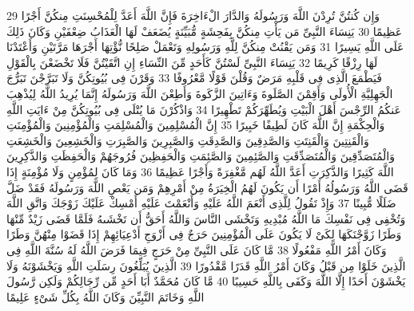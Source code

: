 \documentclass[20pt,a4paper]{article}
\begin{document}
{\tiny\colorbox{cl_aya}{29}} وَإِن كُنتُنَّ تُرِدْنَ اللَّهَ وَرَسُولَهُ وَالدَّارَ الْءَاخِرَةَ فَإِنَّ اللَّهَ أَعَدَّ لِلْمُحْسِنَتِ مِنكُنَّ أَجْرًا عَظِيمًا
{\tiny\colorbox{cl_aya}{30}} يَنِسَاءَ النَّبِىِّ مَن يَأْتِ مِنكُنَّ بِفَحِشَةٍ مُّبَيِّنَةٍ يُضَعَفْ لَهَا الْعَذَابُ ضِعْفَيْنِ وَكَانَ ذَلِكَ عَلَى اللَّهِ يَسِيرًا
{\tiny\colorbox{cl_aya}{31}} وَمَن يَقْنُتْ مِنكُنَّ لِلَّهِ وَرَسُولِهِ وَتَعْمَلْ صَلِحًا نُّؤْتِهَا أَجْرَهَا مَرَّتَيْنِ وَأَعْتَدْنَا لَهَا رِزْقًا كَرِيمًا
{\tiny\colorbox{cl_aya}{32}} يَنِسَاءَ النَّبِىِّ لَسْتُنَّ كَأَحَدٍ مِّنَ النِّسَاءِ إِنِ اتَّقَيْتُنَّ فَلَا تَخْضَعْنَ بِالْقَوْلِ فَيَطْمَعَ الَّذِى فِى قَلْبِهِ مَرَضٌ وَقُلْنَ قَوْلًا مَّعْرُوفًا
{\tiny\colorbox{cl_aya}{33}} وَقَرْنَ فِى بُيُوتِكُنَّ وَلَا تَبَرَّجْنَ تَبَرُّجَ الْجَهِلِيَّةِ الْأُولَى وَأَقِمْنَ الصَّلَوةَ وَءَاتِينَ الزَّكَوةَ وَأَطِعْنَ اللَّهَ وَرَسُولَهُ إِنَّمَا يُرِيدُ اللَّهُ لِيُذْهِبَ عَنكُمُ الرِّجْسَ أَهْلَ الْبَيْتِ وَيُطَهِّرَكُمْ تَطْهِيرًا
{\tiny\colorbox{cl_aya}{34}} وَاذْكُرْنَ مَا يُتْلَى فِى بُيُوتِكُنَّ مِنْ ءَايَتِ اللَّهِ وَالْحِكْمَةِ إِنَّ اللَّهَ كَانَ لَطِيفًا خَبِيرًا
{\tiny\colorbox{cl_aya}{35}} إِنَّ الْمُسْلِمِينَ وَالْمُسْلِمَتِ وَالْمُؤْمِنِينَ وَالْمُؤْمِنَتِ وَالْقَنِتِينَ وَالْقَنِتَتِ وَالصَّدِقِينَ وَالصَّدِقَتِ وَالصَّبِرِينَ وَالصَّبِرَتِ وَالْخَشِعِينَ وَالْخَشِعَتِ وَالْمُتَصَدِّقِينَ وَالْمُتَصَدِّقَتِ وَالصَّئِمِينَ وَالصَّئِمَتِ وَالْحَفِظِينَ فُرُوجَهُمْ وَالْحَفِظَتِ وَالذَّكِرِينَ اللَّهَ كَثِيرًا وَالذَّكِرَتِ أَعَدَّ اللَّهُ لَهُم مَّغْفِرَةً وَأَجْرًا عَظِيمًا
{\tiny\colorbox{cl_aya}{36}} وَمَا كَانَ لِمُؤْمِنٍ وَلَا مُؤْمِنَةٍ إِذَا قَضَى اللَّهُ وَرَسُولُهُ أَمْرًا أَن يَكُونَ لَهُمُ الْخِيَرَةُ مِنْ أَمْرِهِمْ وَمَن يَعْصِ اللَّهَ وَرَسُولَهُ فَقَدْ ضَلَّ ضَلَلًا مُّبِينًا
{\tiny\colorbox{cl_aya}{37}} وَإِذْ تَقُولُ لِلَّذِى أَنْعَمَ اللَّهُ عَلَيْهِ وَأَنْعَمْتَ عَلَيْهِ أَمْسِكْ عَلَيْكَ زَوْجَكَ وَاتَّقِ اللَّهَ وَتُخْفِى فِى نَفْسِكَ مَا اللَّهُ مُبْدِيهِ وَتَخْشَى النَّاسَ وَاللَّهُ أَحَقُّ أَن تَخْشَىهُ فَلَمَّا قَضَى زَيْدٌ مِّنْهَا وَطَرًا زَوَّجْنَكَهَا لِكَىْ لَا يَكُونَ عَلَى الْمُؤْمِنِينَ حَرَجٌ فِى أَزْوَجِ أَدْعِيَائِهِمْ إِذَا قَضَوْا مِنْهُنَّ وَطَرًا وَكَانَ أَمْرُ اللَّهِ مَفْعُولًا
{\tiny\colorbox{cl_aya}{38}} مَّا كَانَ عَلَى النَّبِىِّ مِنْ حَرَجٍ فِيمَا فَرَضَ اللَّهُ لَهُ سُنَّةَ اللَّهِ فِى الَّذِينَ خَلَوْا مِن قَبْلُ وَكَانَ أَمْرُ اللَّهِ قَدَرًا مَّقْدُورًا
{\tiny\colorbox{cl_aya}{39}} الَّذِينَ يُبَلِّغُونَ رِسَلَتِ اللَّهِ وَيَخْشَوْنَهُ وَلَا يَخْشَوْنَ أَحَدًا إِلَّا اللَّهَ وَكَفَى بِاللَّهِ حَسِيبًا
{\tiny\colorbox{cl_aya}{40}} مَّا كَانَ مُحَمَّدٌ أَبَا أَحَدٍ مِّن رِّجَالِكُمْ وَلَكِن رَّسُولَ اللَّهِ وَخَاتَمَ النَّبِيِّنَ وَكَانَ اللَّهُ بِكُلِّ شَىْءٍ عَلِيمًا
\end{document}

